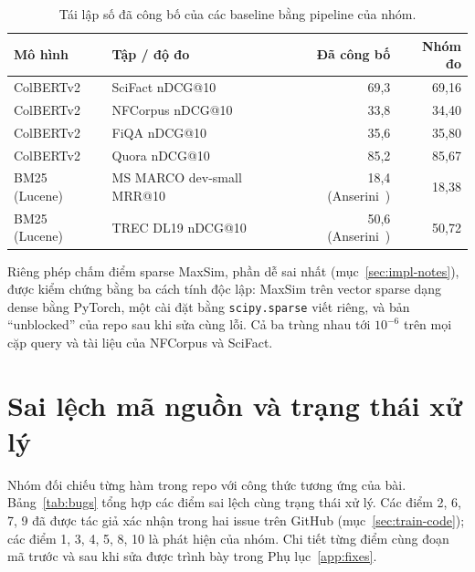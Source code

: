 \documentclass[a4paper,13pt]{extreport}
\makeatletter
\theoremstyle{plain}
\newcommand{\ndcg}{nDCG@10}
\newcommand{\mrr}{MRR@10}
\makeatother
\begin{document}
\begin{table}[htbp]
\centering
\caption{Tái lập số đã công bố của các baseline bằng pipeline của nhóm.}
\label{tab:sanity}
\small
\begin{tabular}{llrr}
\toprule
\textbf{Mô hình} & \textbf{Tập / độ đo} & \textbf{Đã công bố} & \textbf{Nhóm đo}\\
\midrule
ColBERTv2 & SciFact \ndcg & 69,3 & 69,16\\
ColBERTv2 & NFCorpus \ndcg & 33,8 & 34,40\\
ColBERTv2 & FiQA \ndcg & 35,6 & 35,80\\
ColBERTv2 & Quora \ndcg & 85,2 & 85,67\\
BM25 (Lucene) & MS MARCO dev-small \mrr & 18,4 (Anserini~\cite{yang2017}) & 18,38\\
BM25 (Lucene) & TREC DL19 \ndcg & 50,6 (Anserini~\cite{yang2017}) & 50,72\\
\bottomrule
\end{tabular}
\end{table}

Riêng phép chấm điểm sparse MaxSim, phần dễ sai nhất (mục~\ref{sec:impl-notes}), được kiểm chứng bằng ba cách tính độc lập: MaxSim trên vector sparse dạng dense bằng PyTorch, một cài đặt bằng \texttt{scipy.sparse} viết riêng, và bản ``unblocked'' của repo sau khi sửa cùng lỗi. Cả ba trùng nhau tới $10^{-6}$ trên mọi cặp query và tài liệu của NFCorpus và SciFact.

\section{Sai lệch mã nguồn và trạng thái xử lý}
\label{sec:bugs}
Nhóm đối chiếu từng hàm trong repo với công thức tương ứng của bài. Bảng~\ref{tab:bugs} tổng hợp các điểm sai lệch cùng trạng thái xử lý. Các điểm 2, 6, 7, 9 đã được tác giả xác nhận trong hai issue trên GitHub (mục~\ref{sec:train-code}); các điểm 1, 3, 4, 5, 8, 10 là phát hiện của nhóm. Chi tiết từng điểm cùng đoạn mã trước và sau khi sửa được trình bày trong Phụ lục~\ref{app:fixes}.
\end{document}
